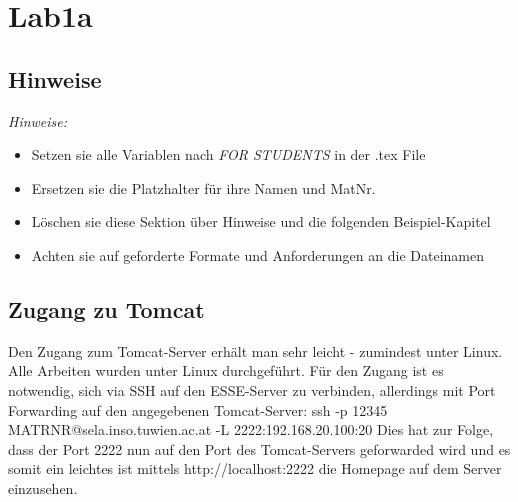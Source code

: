 \documentclass[12pt,a4paper,titlepage,oneside]{scrartcl}
\begin{document}
\maketitle
\setcounter{section}{0}
\setcounter{tocdepth}{2}
\tableofcontents

%
%

\section{Lab1a}

\subsection{Hinweise}
\emph{Hinweise:}
\begin{itemize}
    \item Setzen sie alle Variablen nach \emph{FOR STUDENTS} in der .tex File
    \item Ersetzen sie die Platzhalter für ihre Namen und MatNr.
    \item Löschen sie diese Sektion über Hinweise und die folgenden Beispiel-Kapitel
    \item Achten sie auf geforderte Formate und Anforderungen an die Dateinamen
\end{itemize}

\subsection{Zugang zu Tomcat}
Den Zugang zum Tomcat-Server erhält man sehr leicht - zumindest unter Linux. Alle Arbeiten wurden unter Linux
durchgeführt. Für den Zugang ist es notwendig, sich via SSH auf den ESSE-Server zu verbinden, allerdings mit Port Forwarding
auf den angegebenen Tomcat-Server:\linebreak
ssh -p 12345 MATRNR@sela.inso.tuwien.ac.at -L 2222:192.168.20.100:20\linebreak
Dies hat zur Folge, dass der Port 2222 nun auf den Port des Tomcat-Servers geforwarded wird und es somit ein leichtes
ist mittels http://localhost:2222 die Homepage auf dem Server einzusehen.
\end{document}
